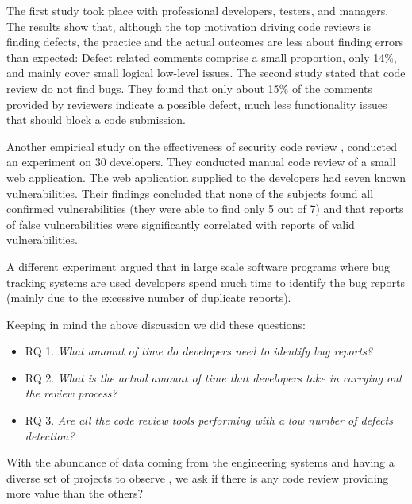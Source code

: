 \documentclass[ifip]{svmult}
\begin{document}
The first study \cite{contribution9} took place with professional developers, testers, and managers. 
The results show that, although the top motivation driving code reviews is finding defects, the practice and the 
actual outcomes are less about finding errors than expected: Defect related comments comprise a small proportion, only 14\%, 
and mainly cover small logical low-level issues.
The second study \cite{contribution20} stated that code review do not find bugs. They found that only about 
15\% of the comments provided by reviewers indicate a possible defect, much less functionality issues that should block a 
code submission. 

Another empirical study on the effectiveness of security code review \cite{contribution1}, conducted an experiment on 30 developers. They 
conducted manual code review of a small web application. The web application supplied to the developers had seven known vulnerabilities. 
Their findings concluded that none of the subjects found all confirmed vulnerabilities (they were able to find only 5 out of 7) 
and that reports of false vulnerabilities were significantly correlated with reports of valid vulnerabilities.

A different experiment argued that in large scale software programs where bug tracking systems 
are used developers spend much time to identify the bug reports (mainly due to the excessive number 
of duplicate reports). 

Keeping in mind the above discussion we did these questions:

\begin{itemize}
 \item RQ 1. \textit{What amount of time do developers need to identify bug reports?}
 \item RQ 2. \textit{What is the actual amount of time that developers take in carrying out the review process?}
 \item RQ 3. \textit{Are all the code review tools performing with a low number of defects detection?}
\end{itemize}


With the abundance of data coming from the engineering systems and having a diverse set of projects to observe 
\cite{contribution12, contribution13}, we ask 
if there is any code review providing more value than the others?
\end{document}
